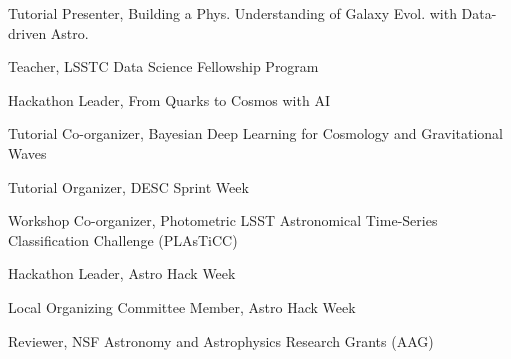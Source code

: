 \documentclass[11pt,letterpaper]{article}
\begin{document}
\nopagebreak\begin{list}{}{\malzlist}
	\item Tutorial Presenter, Building a Phys. Understanding of Galaxy Evol. with Data-driven Astro. 
	\item Teacher, LSSTC Data Science Fellowship Program 
	\item Hackathon Leader, From Quarks to Cosmos with AI 
	\item Tutorial Co-organizer, Bayesian Deep Learning for Cosmology and Gravitational Waves 
	\item Tutorial Organizer, DESC Sprint Week 
	\item Workshop Co-organizer, Photometric LSST Astronomical Time-Series Classification Challenge (PLAsTiCC) 
	\item Hackathon Leader, Astro Hack Week 
	\item Local Organizing Committee Member, Astro Hack Week 
	\item Reviewer, NSF Astronomy and Astrophysics Research Grants (AAG) 
\end{list}
\end{document}
